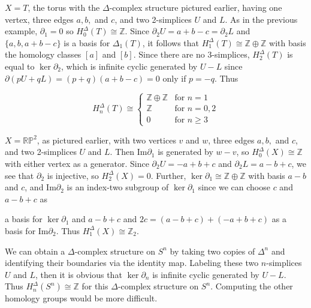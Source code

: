 \begin{example}
\label{ex:simplicial-homology-torus}
$X = T$, the torus with the $\Delta$-complex structure pictured earlier, having
one vertex, three edges $a, b,$ and $c$, and two 2-simplices $U$ and $L$. As in the previous
example, $\partial_1 = 0$ so $H^\Delta_0(T) \cong \mathbb{Z}$. Since $\partial_2 U = a + b - c = \partial_2 L$ and $\{a, b, a+b-c\}$ is
a basis for $\Delta_1(T)$, it follows that $H^\Delta_1(T) \cong \mathbb{Z} \oplus \mathbb{Z}$ with basis the homology classes $[a]$
and $[b]$. Since there are no 3-simplices, $H^\Delta_2(T)$ is equal to $\ker\partial_2$, which is infinite
cyclic generated by $U - L$ since $\partial(pU + qL) = (p+q)(a+b-c) = 0$ only if $p = -q$.
Thus
\end{example}

$$H^\Delta_n(T) \cong \begin{cases} \mathbb{Z} \oplus \mathbb{Z} & \text{for } n = 1 \\ \mathbb{Z} & \text{for } n = 0, 2 \\ 0 & \text{for } n \geq 3 \end{cases}$$

\begin{example}
\label{ex:simplicial-homology-rp2}
$X = \mathbb{RP}^2$, as pictured earlier, with two vertices $v$ and $w$, three edges
$a, b,$ and $c$, and two 2-simplices $U$ and $L$. Then $\text{Im}\partial_1$ is generated by $w - v$, so
$H^\Delta_0(X) \cong \mathbb{Z}$ with either vertex as a generator. Since $\partial_2 U = -a + b + c$ and $\partial_2 L = a - b + c$,
we see that $\partial_2$ is injective, so $H^\Delta_2(X) = 0$. Further, $\ker\partial_1 \cong \mathbb{Z} \oplus \mathbb{Z}$ with basis $a - b$ and
$c$, and $\text{Im}\partial_2$ is an index-two subgroup of $\ker\partial_1$ since we can choose $c$ and $a - b + c$ as
\end{example}

a basis for $\ker\partial_1$ and $a - b + c$ and $2c = (a - b + c) + (-a + b + c)$ as a basis for
$\text{Im}\partial_2$. Thus $H^\Delta_1(X) \cong \mathbb{Z}_2$.

\begin{example}
\label{ex:delta-complex-sn}
We can obtain a $\Delta$-complex structure on $S^n$ by taking two copies of $\Delta^n$
and identifying their boundaries via the identity map. Labeling these two $n$-simplices
$U$ and $L$, then it is obvious that $\ker\partial_n$ is infinite cyclic generated by $U - L$. Thus
$H^\Delta_n(S^n) \cong \mathbb{Z}$ for this $\Delta$-complex structure on $S^n$. Computing the other homology
groups would be more difficult.
\end{example}

